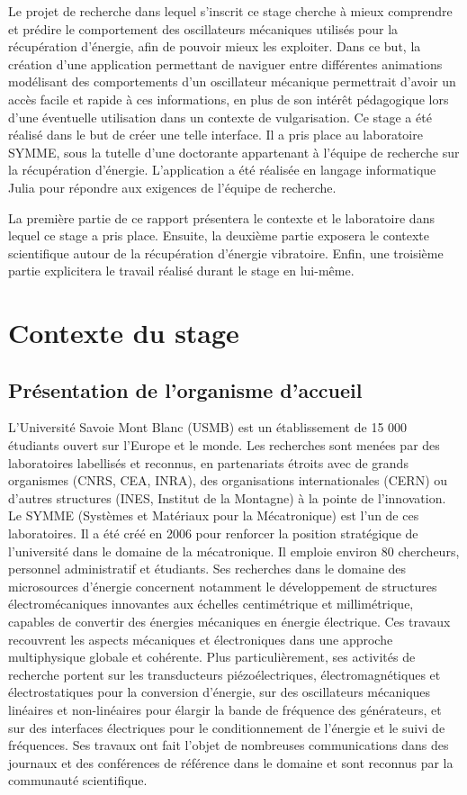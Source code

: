 \documentclass[a4paper, french, 12pt, titlepage]{article}
\begin{document}
Le projet de recherche dans lequel s'inscrit ce stage cherche à mieux comprendre et prédire le comportement des oscillateurs mécaniques utilisés pour la récupération d'énergie, afin de pouvoir mieux les exploiter.
Dans ce but, la création d'une application permettant de naviguer entre différentes animations modélisant des comportements d'un oscillateur mécanique permettrait d'avoir un accès facile et rapide à ces informations, en plus de son intérêt pédagogique lors d'une éventuelle utilisation dans un contexte de vulgarisation.
Ce stage a été réalisé dans le but de créer une telle interface.
Il a pris place au laboratoire SYMME, sous la tutelle d'une doctorante appartenant à l'équipe de recherche sur la récupération d'énergie.
L'application a été réalisée en langage informatique Julia pour répondre aux exigences de l'équipe de recherche.


La première partie de ce rapport présentera le contexte et le laboratoire dans lequel ce stage a pris place.
Ensuite, la deuxième partie exposera le contexte scientifique autour de la récupération d'énergie vibratoire.
Enfin, une troisième partie explicitera le travail réalisé durant le stage en lui-même.

\newpage

\section{Contexte du stage}

\subsection{Présentation de l'organisme d'accueil}

L'Université Savoie Mont Blanc (USMB) est un établissement de 15 000 étudiants ouvert sur l'Europe et le monde.
Les recherches sont menées par des laboratoires labellisés et reconnus, en partenariats étroits avec de grands organismes (CNRS, CEA, INRA), des organisations internationales (CERN) ou d'autres structures (INES, \og{}Institut de la Montagne\fg{}) à la pointe de l'innovation.
Le SYMME (\og{}Systèmes et Matériaux pour la Mécatronique\fg{}) est l'un de ces laboratoires.
Il a été créé en 2006 pour renforcer la position stratégique de l'université dans le domaine de la mécatronique.
Il emploie environ 80 chercheurs, personnel administratif et étudiants.
Ses recherches dans le domaine des microsources d'énergie concernent notamment le développement de structures électromécaniques innovantes aux échelles centimétrique et millimétrique, capables de convertir des énergies mécaniques en énergie électrique.
Ces travaux recouvrent les aspects mécaniques et électroniques dans une approche multiphysique globale et cohérente.
Plus particulièrement, ses activités de recherche portent sur les transducteurs piézoélectriques, électromagnétiques et électrostatiques pour la conversion d'énergie, sur des oscillateurs mécaniques linéaires et non-linéaires pour élargir la bande de fréquence des générateurs, et sur des interfaces électriques pour le conditionnement de l'énergie et le suivi de fréquences.
Ses travaux ont fait l'objet de nombreuses communications dans des journaux et des conférences de référence dans le domaine et sont reconnus par la communauté scientifique.
\end{document}
